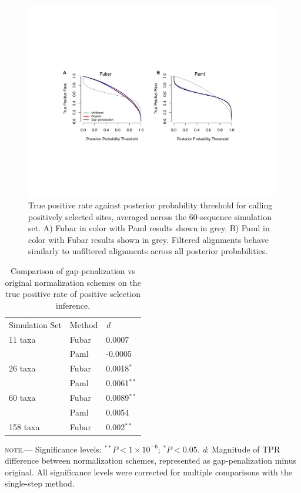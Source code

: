 \documentclass[10pt]{article}
\begin{document}
\begin{figure}[H]
\centerline{\includegraphics[width=5in]{Figures/fulltpr.pdf}}
\caption{\label{fulltpr} True positive rate against posterior probability threshold for calling positively selected sites, averaged across the 60-sequence simulation set. A) Fubar in color with Paml results shown in grey. B) Paml in color with Fubar results shown in grey. Filtered alignments behave similarly to unfiltered alignments across all posterior probabilities.}
\end{figure}



\begin{table}[H]
\caption {\label{tab:penalmodel} Comparison of gap-penalization vs original normalization schemes on the true positive rate of positive selection inference.}
\begin{tabular}{l l l}
\hline\noalign{\smallskip}
Simulation Set & Method & \textit{d} \\
\noalign{\smallskip}\hline\noalign{\smallskip}
11 taxa  & Fubar & 0.0007 \\
              & Paml & -0.0005\\
\hline
26 taxa   & Fubar & 0.0018$^{\ast}$\\
              & Paml & 0.0061$^{\ast\ast}$\\
\hline
60 taxa  & Fubar & 0.0089$^{\ast\ast}$ \\
              & Paml & 0.0054  \\
\hline
158 taxa & Fubar & 0.002$^{\ast\ast}$  \\
\hline
\end{tabular}
\newline
\textsc{note.}--- Significance levels: $^{\ast\ast} P < 1\times10^{-6}$; $^{\ast} P < 0.05$. \textit{d}: Magnitude of TPR difference between normalization schemes, represented as gap-penalization minus original. All significance levels were corrected for multiple comparisons with the single-step method.
\end{table}
\end{document}
